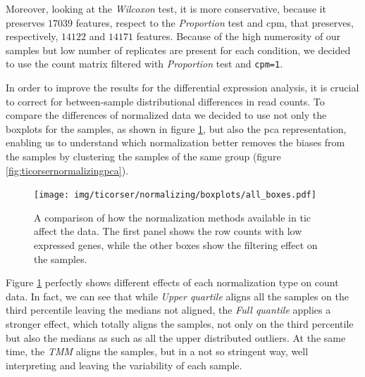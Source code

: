 Moreover, looking at the \textit{Wilcoxon} test, it is more conservative, because it preserves $17039$ features, respect to the \textit{Proportion} test and \gls{cpm}, that preserves, respectively, $14122$ and $14171$ features.
Because of the high numerosity of our samples but low number of replicates are present for each condition, we decided to use the count matrix filtered with \textit{Proportion} test and \lstinline!cpm=1!.

In order to improve the results for the differential expression analysis, it is crucial to correct for between-sample distributional differences in read counts.
To compare the differences of normalized data we decided to use not only the boxplots for the samples, as shown in  figure \ref{fig:ticorsernormalizingbox}, but also the \gls{pca} representation, enabling us to understand which normalization better removes the biases from the samples by clustering the samples of the same group (figure \ref{fig:ticorsernormalizingpca}).

\begin{figure}[H]
\texttt{[image: img/ticorser/normalizing/boxplots/all\_boxes.pdf]}
\caption[ticorser normalizing boxplots]{A comparison of how the normalization methods available in \gls{tic} affect the data.
The first panel shows the row counts with low expressed genes, while the other boxes show the filtering effect on the samples.}
\label{fig:ticorsernormalizingbox}
\centering
\end{figure}

Figure \ref{fig:ticorsernormalizingbox} perfectly shows different effects of each normalization type on count data.  
In fact, we can see that while \textit{Upper quartile} aligns all the samples on the third percentile leaving the medians not aligned, the \textit{Full quantile} applies a stronger effect, which totally aligns the samples, not only on the third percentile but also the medians as such as all the upper distributed outliers.
At the same time, the \textit{TMM} aligns the samples, but in a not so stringent way, well interpreting and leaving the variability of each sample.

